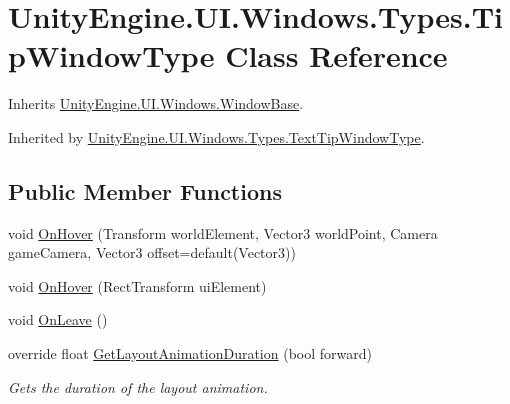\hypertarget{class_unity_engine_1_1_u_i_1_1_windows_1_1_types_1_1_tip_window_type}{}\section{Unity\+Engine.\+U\+I.\+Windows.\+Types.\+Tip\+Window\+Type Class Reference}
\label{class_unity_engine_1_1_u_i_1_1_windows_1_1_types_1_1_tip_window_type}


Inherits \hyperlink{class_unity_engine_1_1_u_i_1_1_windows_1_1_window_base}{Unity\+Engine.\+U\+I.\+Windows.\+Window\+Base}.



Inherited by \hyperlink{class_unity_engine_1_1_u_i_1_1_windows_1_1_types_1_1_text_tip_window_type}{Unity\+Engine.\+U\+I.\+Windows.\+Types.\+Text\+Tip\+Window\+Type}.

\subsection*{Public Member Functions}
\begin{DoxyCompactItemize}
\item 
void \hyperlink{class_unity_engine_1_1_u_i_1_1_windows_1_1_types_1_1_tip_window_type_a79d8fd90d97a16d37f7490f963c8fecd}{On\+Hover} (Transform world\+Element, Vector3 world\+Point, Camera game\+Camera, Vector3 offset=default(Vector3))
\item 
void \hyperlink{class_unity_engine_1_1_u_i_1_1_windows_1_1_types_1_1_tip_window_type_a58482608bc19accf47e72d7cc2cb869b}{On\+Hover} (Rect\+Transform ui\+Element)
\item 
void \hyperlink{class_unity_engine_1_1_u_i_1_1_windows_1_1_types_1_1_tip_window_type_a1eaf6118022b720b5c19302b083b0336}{On\+Leave} ()
\item 
override float \hyperlink{class_unity_engine_1_1_u_i_1_1_windows_1_1_types_1_1_tip_window_type_a9ddfaa16efc362406bd143e533adef14}{Get\+Layout\+Animation\+Duration} (bool forward)
\begin{DoxyCompactList}\small\item\em Gets the duration of the layout animation. \end{DoxyCompactList}\end{DoxyCompactItemize}
